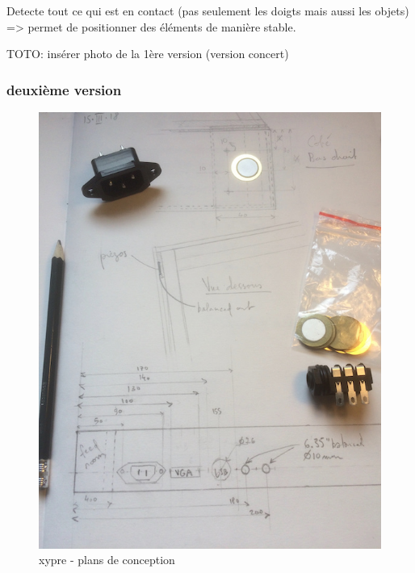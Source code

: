 Detecte tout ce qui est en contact (pas seulement les doigts mais aussi les objets) => permet de positionner des éléments de manière stable.

TOTO: insérer photo de la 1ère version (version concert)

\subsubsection{deuxième version}

\begin{figure}[!htbp]
	\includegraphics[width=\textwidth]{gfx/04_interfaces/Xypre_plan01_72dpi.jpg}
	\caption{xypre - plans de conception}
	\label{fig:interface:xypre_plans}
\end{figure}

